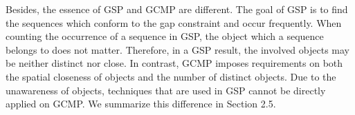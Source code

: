 {Besides, the essence of GSP and GCMP are different. The goal of GSP 
is to find the sequences which conform to the gap constraint and occur frequently.
When counting the occurrence of a sequence in GSP, the object
which a sequence belongs to does not matter. Therefore, 
in a GSP result, the involved objects may be neither
 distinct nor close.
In contrast, GCMP imposes requirements on both the spatial closeness 
of objects and the number of distinct objects.
Due to the unawareness of objects, techniques that are used in GSP 
cannot be directly applied on GCMP. We summarize this difference
in Section 2.5.
%
%
%
%
%
%
}

